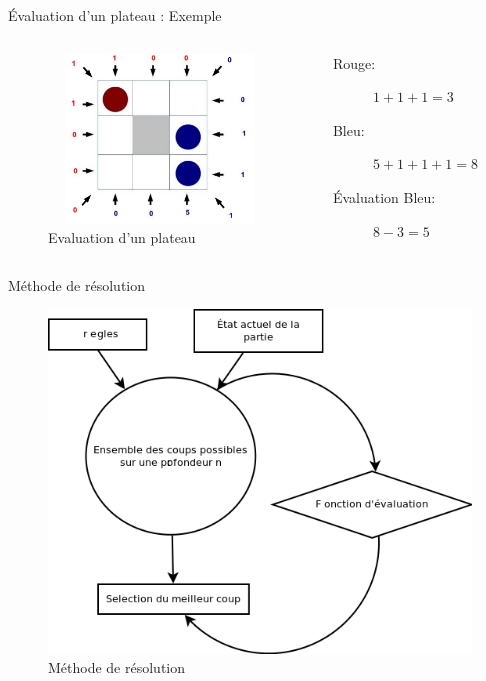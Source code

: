 \documentclass[compress, 12pt]{beamer}
\begin{document}
\begin{frame}{Évaluation d'un plateau : Exemple}
    \begin{columns}
        \begin{column}[l]{0.5\textwidth}
            \begin{figure}
                \includegraphics[width=1.05\textwidth, height=4.5cm]{./pix/evaluation}
                \centering
                \caption{Evaluation d'un plateau}
            \end{figure}
        \end{column}
        
        \begin{column}[r]{0.5\textwidth}
            \begin{description}
                \item[Rouge:] $1 + 1 + 1 = 3$
                \item[Bleu:] $5 + 1 + 1 + 1 = 8$
                \item[Évaluation Bleu:] $8 -3 = 5$
            \end{description}
        \end{column}

  \end{columns}
\end{frame}

\begin{frame}{Méthode de résolution}
  \begin{figure}
    \includegraphics[height=0.7\textheight]{./pix/methode}
    \centering
    \caption{Méthode de résolution}
  \end{figure}
\end{frame}
\end{document}
